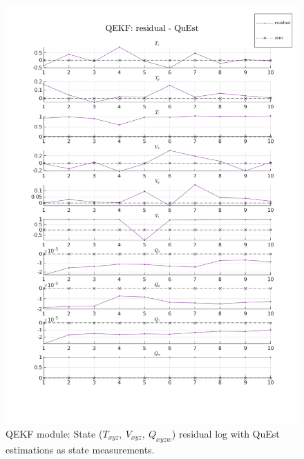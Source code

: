 \documentclass[11pt]{article}
\begin{document}
\begin{itemize}
    \begin{figure}[H]
      \begin{center}
        \includegraphics[width=\linewidth]{plt_qekf_log_residual_QuEst.png}
      \end{center}
      \caption{QEKF module: State ($T_{xyz},~V_{xyz},~Q_{xyzw}$) residual log
      with QuEst estimations as state measurements.}
    \end{figure}


\end{itemize}
\end{document}
